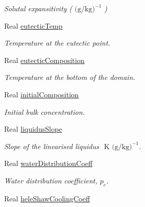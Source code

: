 \begin{DoxyCompactItemize}
\begin{DoxyCompactList}\small\item\em Solutal expansitivity ( $\mbox{(g/kg)}^{-1}$ ) \end{DoxyCompactList}\item 
\hypertarget{class_mushy_layer_params_a7e4644fe40db5622b9ff782e46b968c8}{Real \hyperlink{class_mushy_layer_params_a7e4644fe40db5622b9ff782e46b968c8}{eutectic\-Temp}}\label{class_mushy_layer_params_a7e4644fe40db5622b9ff782e46b968c8}

\begin{DoxyCompactList}\small\item\em Temperature at the eutectic point. \end{DoxyCompactList}\item 
Real \hyperlink{class_mushy_layer_params_a0bda0637f2ed28646edd079ebc2e3f71}{eutectic\-Composition}
\begin{DoxyCompactList}\small\item\em Temperature at the bottom of the domain. \end{DoxyCompactList}\item 
\hypertarget{class_mushy_layer_params_ad4d662e2932cc5ee90ecd5caa6ba466a}{Real \hyperlink{class_mushy_layer_params_ad4d662e2932cc5ee90ecd5caa6ba466a}{initial\-Composition}}\label{class_mushy_layer_params_ad4d662e2932cc5ee90ecd5caa6ba466a}

\begin{DoxyCompactList}\small\item\em Initial bulk concentration. \end{DoxyCompactList}\item 
\hypertarget{class_mushy_layer_params_a36aab0acf29577d5eef1f92870ee60f2}{Real \hyperlink{class_mushy_layer_params_a36aab0acf29577d5eef1f92870ee60f2}{liquidus\-Slope}}\label{class_mushy_layer_params_a36aab0acf29577d5eef1f92870ee60f2}

\begin{DoxyCompactList}\small\item\em Slope of the linearised liquidus $\mbox{ K (g/kg)}^{-1} $. \end{DoxyCompactList}\item 
Real \hyperlink{class_mushy_layer_params_a2b0038ec10c9660952ea88efd146a846}{water\-Distribution\-Coeff}
\begin{DoxyCompactList}\small\item\em Water distribution coefficient, $ p_c $. \end{DoxyCompactList}\item 
\hypertarget{class_mushy_layer_params_aad3b65b68693c8e28778eed4738cfeb7}{Real \hyperlink{class_mushy_layer_params_aad3b65b68693c8e28778eed4738cfeb7}{hele\-Shaw\-Cooling\-Coeff}}\label{class_mushy_layer_params_aad3b65b68693c8e28778eed4738cfeb7}


\end{DoxyCompactItemize}
